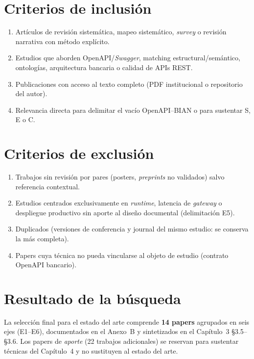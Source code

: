 \section{Criterios de inclusión}

\begin{enumerate}
  \item Artículos de revisión sistemática, mapeo sistemático, \textit{survey} o revisión
        narrativa con método explícito.
  \item Estudios que aborden OpenAPI/\textit{Swagger}, matching estructural/semántico, ontologías,
        arquitectura bancaria o calidad de APIs REST.
  \item Publicaciones con acceso al texto completo (PDF institucional o repositorio del autor).
  \item Relevancia directa para delimitar el vacío OpenAPI--BIAN o para sustentar S, E o C.
\end{enumerate}

\section{Criterios de exclusión}

\begin{enumerate}
  \item Trabajos sin revisión por pares (posters, \textit{preprints} no validados) salvo
        referencia contextual.
  \item Estudios centrados exclusivamente en \textit{runtime}, latencia de \textit{gateway} o
        despliegue productivo sin aporte al diseño documental (delimitación E5).
  \item Duplicados (versiones de conferencia y journal del mismo estudio: se conserva la más
        completa).
  \item Papers cuya técnica no pueda vincularse al objeto de estudio (contrato OpenAPI bancario).
\end{enumerate}

\section{Resultado de la búsqueda}

La selección final para el estado del arte comprende \textbf{14 papers} agrupados en seis ejes
(E1--E6), documentados en el Anexo~B y sintetizados en el Capítulo~3 §3.5--§3.6. Los papers de
\textit{aporte} (22 trabajos adicionales) se reservan para sustentar técnicas del
Capítulo~4 y no sustituyen al estado del arte.
